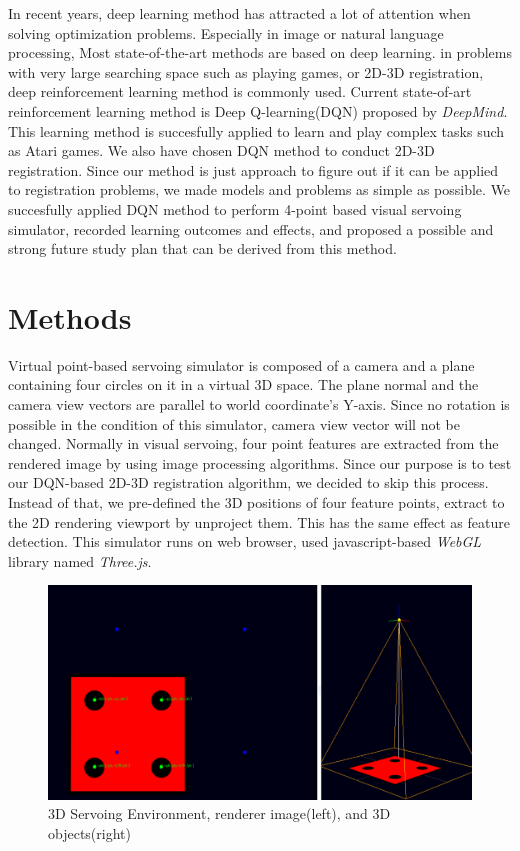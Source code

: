 \documentclass[10pt]{article}
\begin{document}
 In recent years, deep learning method has attracted a lot of attention when solving optimization problems. Especially in image or natural language processing, Most state-of-the-art methods are based on deep learning\cite{deepimage, deeplanguage}. in problems with very large searching space such as playing games, or 2D-3D registration, deep reinforcement learning method is commonly used. Current state-of-art reinforcement learning method is Deep Q-learning(DQN)\cite{dqn} proposed by \emph{DeepMind}. This learning method is succesfully applied to learn and play complex tasks such as Atari games\cite{ref2}. We also have chosen DQN method to conduct 2D-3D registration. Since our method is just approach to figure out if it can be applied to registration problems, we made models and problems as simple as possible. We succesfully applied DQN method to perform 4-point based visual servoing simulator, recorded learning outcomes and effects, and proposed a possible and strong future study plan that can be derived from this method.

\section{Methods}
Virtual point-based servoing simulator is composed of a camera and a plane containing four circles on it in a virtual 3D space. The plane normal and the camera view vectors are parallel to world coordinate's Y-axis. Since no rotation is possible in the condition of this simulator, camera view vector will not be changed. Normally in visual servoing, four point features are extracted from the rendered image by using image processing algorithms. Since our purpose is to test our DQN-based 2D-3D registration algorithm, we decided to skip this process. Instead of that, we pre-defined the 3D positions of four feature points, extract to the 2D rendering viewport by unproject them. This has the same effect as feature detection. This simulator runs on web browser, used javascript-based \emph{WebGL} library named \emph{Three.js}.

\begin{figure}[htb]
\begin{center}
\includegraphics[width=0.8\columnwidth]{images/fig-temp1.png}
\caption{3D Servoing Environment, renderer image(left), and 3D objects(right)}
\label{fig1}
\end{center}
\end{figure}
\end{document}
